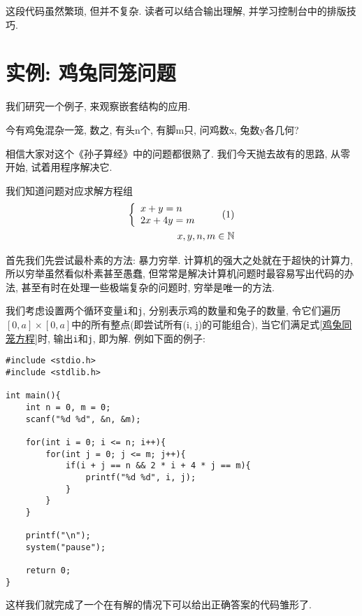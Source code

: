         这段代码虽然繁琐, 但并不复杂. 读者可以结合输出理解, 并学习控制台中的排版技巧.

    \section{实例: 鸡兔同笼问题}
        我们研究一个例子, 来观察嵌套结构的应用.

        \begin{center}
            今有鸡兔混杂一笼, 数之, 有头n个, 有脚m只, 问鸡数x, 兔数y各几何?
        \end{center}

        相信大家对这个《孙子算经》中的问题都很熟了. 我们今天抛去故有的思路, 从零开始, 试着用程序解决它.

        我们知道问题对应求解方程组
        \begin{align}
            \left\{
                \begin{array}{l}
                    x + y = n \\
                    2x + 4y = m
                \end{array}
            \right. \tag{1} \\
            x, y, n, m  \in \mathbb{N}  \notag
        \end{align} \label{鸡兔同笼方程}

        首先我们先尝试最朴素的方法: 暴力穷举. 计算机的强大之处就在于超快的计算力, 所以穷举虽然看似朴素甚至愚蠢, 但常常是解决计算机问题时最容易写出代码的办法, 甚至有时在处理一些极端复杂的问题时, 穷举是唯一的方法. 
        
        我们考虑设置两个循环变量\texttt{i}和\texttt{j}, 分别表示鸡的数量和兔子的数量, 令它们遍历 $ [0, a] \times [0, a]$中的所有整点(即尝试所有(i, j)的可能组合), 当它们满足式\ref{鸡兔同笼方程}时, 输出\texttt{i}和\texttt{j}, 即为解. 例如下面的例子:
\begin{lstlisting}
#include <stdio.h>
#include <stdlib.h>

int main(){
    int n = 0, m = 0;
    scanf("%d %d", &n, &m);

    for(int i = 0; i <= n; i++){
        for(int j = 0; j <= m; j++){
            if(i + j == n && 2 * i + 4 * j == m){
                printf("%d %d", i, j);
            }
        }
    }

    printf("\n");
    system("pause");

    return 0;
}
\end{lstlisting}

        这样我们就完成了一个在有解的情况下可以给出正确答案的代码雏形了.
        
